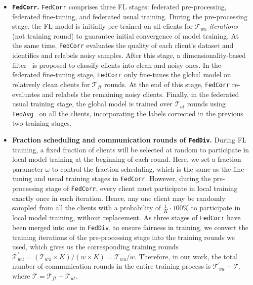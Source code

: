 \documentclass[letterpaper]{article} %
\begin{document}
\begin{itemize}
    \item  \textbf{\texttt{FedCorr}.}  \texttt{FedCorr} comprises three FL stages: federated pre-processing, federated fine-tuning, and federated usual training. During the pre-processing stage, the FL model is initially pre-trained on all clients for $\mathcal{T}_{wu}$ \textit{iterations} (not training round) to guarantee initial convergence of model training. At the same time, \texttt{FedCorr} evaluates the quality of each client's dataset and identifies and relabels noisy samples. After this stage, a dimensionality-based filter~\cite{LID} is proposed to classify clients into clean and noisy ones. In the federated fine-tuning stage, \texttt{FedCorr} only fine-tunes the global model on relatively clean clients for $\mathcal{T}_{ft}$ rounds. At the end of this stage, \texttt{FedCorr} re-evaluates and relabels the remaining noisy clients. Finally, in the federated usual training stage, the global model is trained over $\mathcal{T}_{ut}$ rounds using \texttt{FedAvg}~\cite{FedAvg} on all the clients, incorporating the labels corrected in the previous two training stages.

    \item  \textbf{Fraction scheduling and communication rounds of \texttt{FedDiv}.} During FL training, a fixed fraction of clients will be selected at random to participate in local model training at the beginning of each round. Here, we set a fraction parameter $\omega$ to control the fraction scheduling, which is the same as the fine-tuning and usual training stages in \texttt{FedCorr}. However, during the pre-processing stage of \texttt{FedCorr}, every client must participate in local training exactly once in each iteration. Hence, any one client may be randomly sampled from all the clients with a probability of $\frac{1}{K}\cdot100\%$ to participate in local model training, without replacement. As three stages of \texttt{FedCorr} have been merged into one in \texttt{FedDiv}, to ensure fairness in training, we convert the training iterations of the pre-processing stage into the training rounds we used, which gives us the corresponding training rounds $\mathcal{T}_{wu}^{\prime}=(\mathcal{T}_{wu}\times K)/({w}\times K)=\mathcal{T}_{wu}/{w}$. Therefore, in our work, the total number of communication rounds in the entire training process is $\mathcal{T}_{wu}^{\prime}+\mathcal{T}$, where $\mathcal{T}=\mathcal{T}_{ft}+\mathcal{T}_{ut}$.
\end{itemize}
\end{document}
